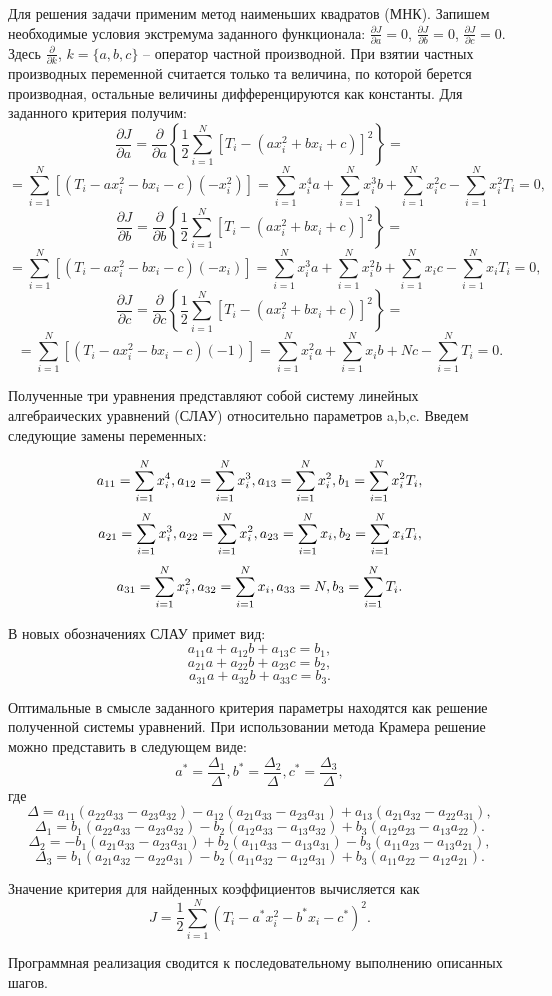\solutionSection

Для решения задачи применим метод наименьших квадратов (МНК). Запишем необходимые условия экстремума 
заданного функционала: $\frac{\partial J}{\partial a}=0$,   $\frac{\partial J}{\partial b}=0$,   $\frac{\partial J}{\partial c}=0$. 
Здесь $\frac{\partial}{\partial k}$, $k=\{a,b,c\}$ – оператор частной производной. При взятии частных производных 
переменной считается только та величина, по которой берется производная, остальные величины дифференцируются 
как константы. Для заданного критерия получим:
$$\frac{\partial J}{\partial a}=\frac{\partial }{\partial a} \left\{ \frac{1}{2} \sum_{i=1}^N [T_i-(ax_i^2+bx_i+c)]^2 \right\}=$$
    $$=\sum_{i=1}^N [(T_i-ax_i^2-bx_i-c)(-x_i^2 )] = \sum_{i=1}^N x_i^4 a+\sum_{i=1}^N x_i^3 b+\sum_{i=1}^N x_i^2 c-\sum_{i=1}^N x_i^2 T_i =0,$$
$$\frac{\partial J}{\partial b}=\frac{\partial }{\partial b} \left\{ \frac{1}{2} \sum_{i=1}^N [T_i-(ax_i^2+bx_i+c)]^2 \right\}=$$
    $$=\sum_{i=1}^N [(T_i-ax_i^2-bx_i-c)(-x_i )] = \sum_{i=1}^N x_i^3 a+\sum_{i=1}^N x_i^2 b+\sum_{i=1}^N x_i c-\sum_{i=1}^N x_i T_i =0,$$
$$\frac{\partial J}{\partial c}=\frac{\partial }{\partial c} \left\{ \frac{1}{2} \sum_{i=1}^N [T_i-(ax_i^2+bx_i+c)]^2 \right\}=$$
    $$=\sum_{i=1}^N [(T_i-ax_i^2-bx_i-c)(-1)] = \sum_{i=1}^N x_i^2 a+\sum_{i=1}^N x_i b+Nc-\sum_{i=1}^N T_i =0.$$

Полученные три уравнения представляют собой систему линейных алгебраических уравнений (СЛАУ) относительно параметров a,b,c. Введем следующие замены переменных: 

$$a_{11}=\sum_{i=1}^N x_i^4, \space a_{12}=\sum_{i=1}^N x_i^3, \space a_{13}=\sum_{i=1}^N x_i^2, \space b_1=\sum_{i=1}^N x_i^2 T_i,$$
$$a_{21}=\sum_{i=1}^N x_i^3, \space a_{22}=\sum_{i=1}^N x_i^2, \space a_{23}=\sum_{i=1}^N x_i, \space b_2=\sum_{i=1}^N x_i T_i,$$
$$a_{31}=\sum_{i=1}^N x_i^2, \space a_{32}=\sum_{i=1}^N x_i, \space a_{33}=N, \space b_3=\sum_{i=1}^N T_i.$$

В новых обозначениях СЛАУ примет вид:
$$a_{11} a+a_{12} b+a_{13} c=b_{1},$$
$$a_{21} a+a_{22} b+a_{23} c=b_{2},$$
$$a_{31} a+a_{32} b+a_{33} c=b_{3}.$$

Оптимальные в смысле заданного критерия параметры находятся как решение полученной системы уравнений. При использовании метода Крамера решение можно представить в следующем виде:
$$a^*=\frac{\Delta_1}{\Delta},b^*=\frac{\Delta_2}{\Delta},c^*=\frac{\Delta_3}{\Delta},$$
где
$$\Delta=a_{11} (a_{22} a_{33}-a_{23} a_{32})-a_{12} (a_{21} a_{33}-a_{23} a_{31})+a_{13} (a_{21} a_{32}-a_{22} a_{31}),$$
$$\Delta_1=b_1 (a_{22} a_{33}-a_{23} a_{32})-b_2 (a_{12} a_{33}-a_{13} a_{32})+b_3 (a_{12} a_{23}-a_{13} a_{22}).$$
$$\Delta_2=-b_1 (a_{21} a_{33}-a_{23} a_{31})+b_2 (a_{11} a_{33}-a_{13} a_{31})-b_3 (a_{11} a_{23}-a_{13} a_{21}),$$
$$\Delta_3=b_1 (a_{21} a_{32}-a_{22} a_{31})-b_2 (a_{11} a_{32}-a_{12} a_{31}) + b_3 (a_{11} a_{22}-a_{12} a_{21}).$$

Значение критерия для найденных коэффициентов вычисляется как
$$J=\frac{1}{2} \sum_{i=1}^N (T_i-a^* x_i^2-b^* x_i-c^* )^2 .$$

Программная реализация сводится к последовательному выполнению описанных шагов.

